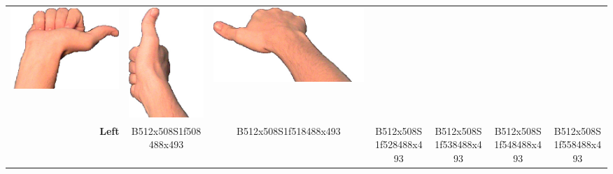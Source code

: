 \documentclass{article}
\begin{document}
\begin{center}
\begin{tabular}{r*{6}{c}}
\includegraphics[scale=0.1]{images/10-01-4.jpg}&
\includegraphics[scale=0.1]{images/10-01-5.jpg}&
\includegraphics[scale=0.1]{images/10-01-6.jpg}\\
\textbf{Left}&
B512x508S1f508488x493&
B512x508S1f518488x493&
B512x508S1f528488x493&
B512x508S1f538488x493&
B512x508S1f548488x493&
B512x508S1f558488x493\\
\end{tabular}
\end{center}
\end{document}
